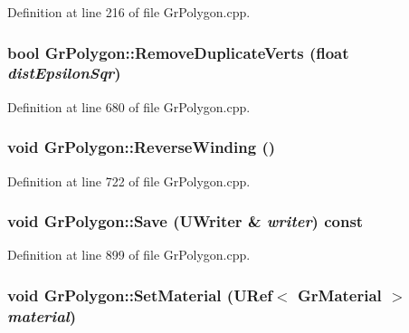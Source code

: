 \begin{CompactItemize}
Definition at line 216 of file GrPolygon.cpp.\hypertarget{class_gr_polygon_4a31719da237646860956200e58b0385}{
\subsubsection[{RemoveDuplicateVerts}]{\setlength{\rightskip}{0pt plus 5cm}bool GrPolygon::RemoveDuplicateVerts (float {\em distEpsilonSqr})}}
\label{class_gr_polygon_4a31719da237646860956200e58b0385}




Definition at line 680 of file GrPolygon.cpp.\hypertarget{class_gr_polygon_20c41a3935e2256793edd844b351b750}{
\subsubsection[{ReverseWinding}]{\setlength{\rightskip}{0pt plus 5cm}void GrPolygon::ReverseWinding ()}}
\label{class_gr_polygon_20c41a3935e2256793edd844b351b750}




Definition at line 722 of file GrPolygon.cpp.\hypertarget{class_gr_polygon_8124d42ce98f591b5e75c63b1adc673c}{
\subsubsection[{Save}]{\setlength{\rightskip}{0pt plus 5cm}void GrPolygon::Save ({\bf UWriter} \& {\em writer}) const}}
\label{class_gr_polygon_8124d42ce98f591b5e75c63b1adc673c}




Definition at line 899 of file GrPolygon.cpp.\hypertarget{class_gr_polygon_486be53eb2a6e5f805972ac32a0011d2}{
\subsubsection[{SetMaterial}]{\setlength{\rightskip}{0pt plus 5cm}void GrPolygon::SetMaterial ({\bf URef}$<$ {\bf GrMaterial} $>$ {\em material})}}
\label{class_gr_polygon_486be53eb2a6e5f805972ac32a0011d2}





\end{CompactItemize}
